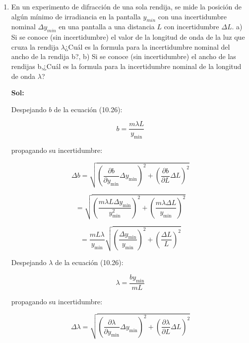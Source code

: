 \documentclass[12pt,a4paper]{article}
\begin{document}
\begin{enumerate}



\item En un experimento de difracción de una sola rendija, se mide la posición de algún mínimo de irradiancia en la pantalla $y_{min}$ con una incertidumbre nominal $\Delta y_{min}$ en una pantalla a una distancia $L$ con incertidumbre $\Delta L$. a) Si se conoce (sin incertidumbre) el valor de la longitud de onda de la luz que cruza la rendija $\lambda$¿Cuál es la formula para la incertidumbre nominal del ancho de la rendija b?, b) Si se conoce (sin incertidumbre) el ancho de las rendijas b,¿Cuál es la formula para la incertidumbre nominal de la longitud de onda $\lambda$?

\textbf{Sol:}

Despejando $b$ de la ecuación (10.26):

\begin{equation*}
    b = \frac{m \lambda L}{y_{\text{min}}}
\end{equation*}

propagando su incertidumbre:

\begin{equation*}
    \Delta b = \sqrt{\left(\frac{\partial b}{\partial y_{\text{min}}}\Delta y_{\text{min}}\right)^{2} + \left(\frac{\partial b}{\partial L} \Delta L\right)^{2}}
\end{equation*}

\begin{equation*}
    = \sqrt{\left(\frac{m\lambda L \Delta y_{\text{min}}}{y_{\text{min}}^{2}}\right)^{2} + \left(\frac{m \lambda \Delta L}{y_{\text{min}}}\right)^{2}}
\end{equation*}

\begin{equation*}
    = \frac{m L\lambda}{y_{\text{min}}} \sqrt{\left(\frac{\Delta y_{\text{min}}}{y_{\text{min}}}\right)^{2} + \left(\frac{\Delta L}{L}\right)^{2}}
\end{equation*}

Despejando $\lambda$ de la ecuación (10.26):

\begin{equation*}
    \lambda = \frac{b y_{\text{min}}}{mL }
\end{equation*}

propagando su incertidumbre:

\begin{equation*}
    \Delta \lambda = \sqrt{\left(\frac{\partial \lambda}{\partial y_{\text{min}}}\Delta y_{\text{min}}\right)^{2} + \left(\frac{\partial \lambda}{\partial L}\Delta L\right)^{2}}
\end{equation*}


\end{enumerate}
\end{document}
